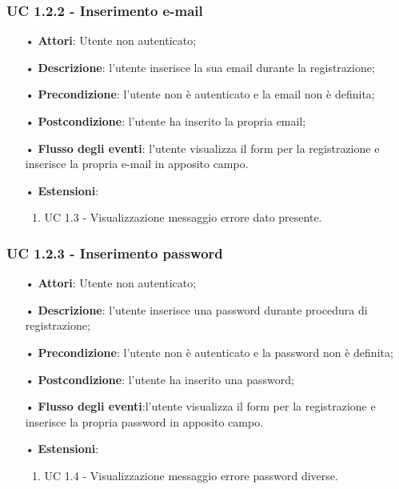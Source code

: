 \subsubsection{UC 1.2.2 - Inserimento e-mail}
\begin{itemize}
	\item[•]\textbf{Attori}: Utente non autenticato;
	\item[•]\textbf{Descrizione}: l'utente inserisce la sua email durante la registrazione;
	\item[•]\textbf{Precondizione}: l'utente non è autenticato e la email non è definita;
	\item[•]\textbf{Postcondizione}: l'utente ha inserito la propria email;
	\item[•]\textbf{Flusso degli eventi}: l'utente visualizza il form per la registrazione e inserisce la propria e-mail in apposito campo.
	\item[•] \textbf{Estensioni}:
		\begin{enumerate}
		\item UC 1.3 - Visualizzazione messaggio errore dato presente.
	\end{enumerate}
\end{itemize}

\subsubsection{UC 1.2.3 - Inserimento password}
\begin{itemize}
	\item[•]\textbf{Attori}: Utente non autenticato;
	\item[•]\textbf{Descrizione}: l'utente inserisce una password durante procedura di registrazione;
	\item[•]\textbf{Precondizione}: l'utente non è autenticato e la password non è definita;
	\item[•]\textbf{Postcondizione}: l'utente ha inserito una password;
	\item[•]\textbf{Flusso degli eventi}:l'utente visualizza il form per la registrazione e inserisce la propria password in apposito campo.
	\item[•] \textbf{Estensioni}:
	\begin{enumerate}
		\item UC 1.4 - Visualizzazione messaggio errore password diverse.
	\end{enumerate}
\end{itemize}

